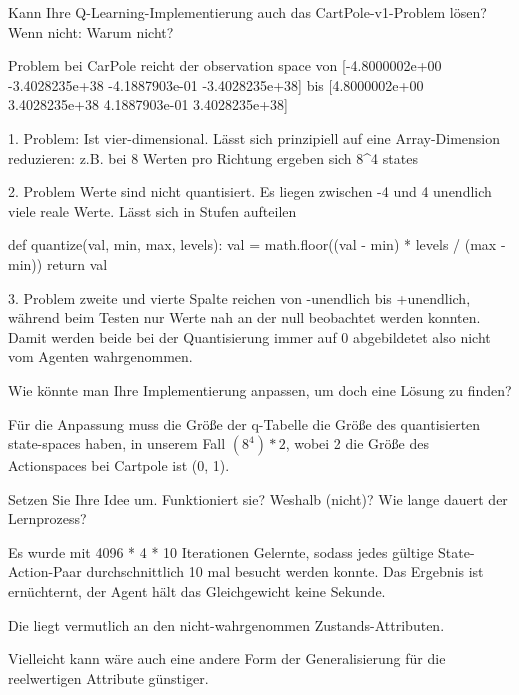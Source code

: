 \documentclass{ocbeameruni}
\begin{document}
\begin{frame}[3.1]
Kann Ihre Q-Learning-Implementierung auch das CartPole-v1-Problem lösen? Wenn nicht:
Warum nicht?

Problem bei CarPole reicht der observation space
von
[-4.8000002e+00 -3.4028235e+38 -4.1887903e-01 -3.4028235e+38]
bis
[4.8000002e+00 3.4028235e+38 4.1887903e-01 3.4028235e+38]
\end{frame}

\begin{frame}[3.1]
1. Problem: Ist vier-dimensional. Lässt sich prinzipiell auf eine Array-Dimension reduzieren:
z.B. bei 8 Werten pro Richtung ergeben sich 8^4 states

2. Problem Werte sind nicht quantisiert. Es liegen zwischen -4 und 4 unendlich viele reale Werte. 
Lässt sich in Stufen aufteilen

    def quantize(val, min, max, levels):
      val = math.floor((val - min) * levels / (max - min))
      return val
\end{frame}


\begin{frame}[3.1]
3. Problem zweite und vierte Spalte reichen von -unendlich bis +unendlich, während beim Testen 
nur Werte nah an der null beobachtet werden konnten. Damit werden beide bei der Quantisierung
immer auf 0 abgebildetet also nicht vom Agenten wahrgenommen.
\end{frame}


\begin{frame}[3.2]
Wie könnte man Ihre Implementierung anpassen, um doch eine Lösung zu finden?

Für die Anpassung muss die Größe der q-Tabelle die Größe des quantisierten state-spaces haben,
in unserem Fall $(8^4)*2$, wobei 2 die Größe des Actionspaces bei Cartpole ist ({0, 1}).
\end{frame}

\begin{frame}[3.3]
Setzen Sie Ihre Idee um. Funktioniert sie? Weshalb (nicht)? Wie lange dauert der Lernprozess?

Es wurde mit 4096 * 4 * 10 Iterationen Gelernte, sodass jedes gültige 
State-Action-Paar durchschnittlich 10 mal besucht werden konnte. Das Ergebnis ist ernüchternt, der Agent
hält das Gleichgewicht keine Sekunde.

Die liegt vermutlich an den nicht-wahrgenommen Zustands-Attributen.

Vielleicht kann wäre auch eine andere Form der Generalisierung für die reelwertigen Attribute günstiger.
\end{frame}
\end{document}
